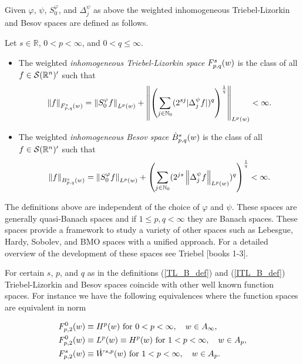 Given $\varphi$, $\psi$, $S^\varphi_0$, and $\Delta^\psi_j$ as above the weighted inhomogeneous Triebel-Lizorkin and Besov spaces are defined as follows. 

\begin{dfn}\label{ITL_B_def}
Let $s\in\mathbb{R}$, $0<p<\infty$, and $0<q\leq\infty$.
\begin{itemize}
\item The weighted \textit{inhomogeneous Triebel-Lizorkin space} $\itlw{p}{s}{q}{w}$ is the class of all $f\in\sw'$ such that
\begin{equation*}
\norm{f}{\itlw{p}{s}{q}{w}}= \norm{S^\varphi_0 f}{L^p(w)} + \norm{\left(\sum_{j\in\naz}(2^{sj}|\Delta^\psi_jf|)^q\right)^{\frac{1}{q}}}{\lebw{p}{w}}<\infty.
\end{equation*}
\item The weighted \textit{inhomogeneous Besov space} $\besw{p}{s}{q}{w}$ is the class of all $f\in\sw'$ such that 
\begin{equation}
\norm{f}{\ibesw{p}{s}{q}{w}} = \norm{S^\varphi_0 f}{L^p(w)} + \left(\sum_{j\in\naz} (2^{js}\norm{\Delta^\psi_jf}{L^p(w)})^q\right)^{\frac{1}{q}} < \infty.
\end{equation}
\end{itemize}
\end{dfn}

The definitions above are independent of the choice of $\varphi$ and $\psi$. These spaces are generally quasi-Banach spaces and if $1\leq p,q <\infty$ they are Banach spaces. These spaces provide a framework to study a variety of other spaces such as Lebesgue, Hardy, Sobolev, and BMO spaces with a unified approach. For a detailed overview of the development of these spaces see Triebel [books 1-3]. 

For certain $s$, $p$, and $q$ as in the definitions (\ref{TL_B_def}) and (\ref{ITL_B_def}) Triebel-Lizorkin and Besov spaces coincide with other well known function spaces. For instance we have the following equivalences where the function spaces are equivalent in norm

\begin{align*}
& \itlw{p}{0}{2}{w} \equiv H^p (w) \text{ for } 0<p<\infty, \quad w\in A_\infty, \\
& \itlw{p}{0}{2}{w} \equiv L^p(w) \equiv H^p(w) \text{ for } 1<p<\infty, \quad w\in A_p, \\
& \itlw{p}{s}{2}{w} \equiv \dot{W}^{s,p}(w) \text{ for } 1<p<\infty, \quad w\in A_p.
\end{align*}

